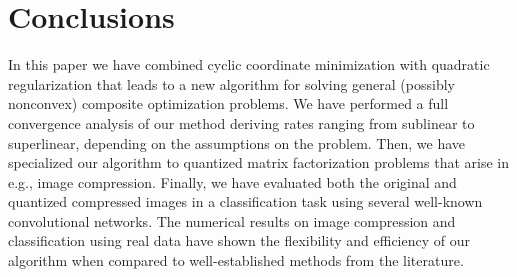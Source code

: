 \documentclass[lettersize,journal]{IEEEtran}
\begin{document}

\section{Conclusions}
In this paper we have combined cyclic coordinate minimization with quadratic regularization that leads to a new algorithm for  solving  general (possibly nonconvex) composite  optimization problems.  We have performed  a full  convergence  analysis  of  our  method deriving rates ranging from sublinear to superlinear, depending on the assumptions on the problem. Then, we have specialized our algorithm to  quantized matrix factorization problems that arise in e.g.,   image compression. Finally, we have evaluated both  the original and  quantized compressed images in a classification task using several  well-known convolutional networks. The numerical results on image compression and classification using real data have shown the flexibility and  efficiency of our  algorithm when compared to well-established methods from the literature.


            
\end{document}
